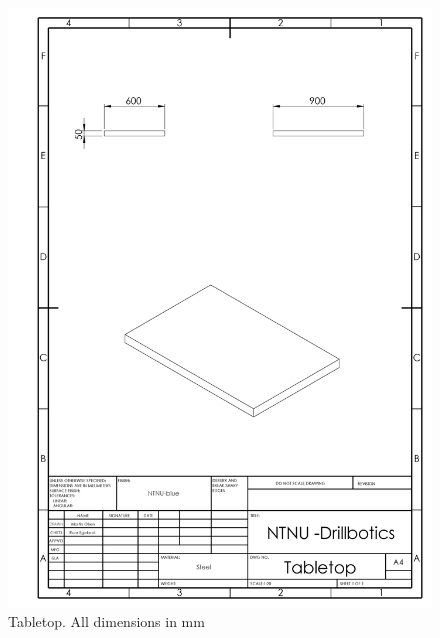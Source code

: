 \newpage
\begin{figure} [H]
\centering
\includegraphics[width=1.0\textwidth]{figures/mechdrawings/Tabletop.JPG}
\caption{Tabletop. All dimensions in mm} 
\label{fig:tabletop}
\end{figure}

